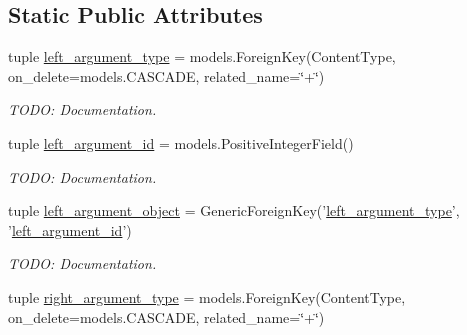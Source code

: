 \subsection*{Static Public Attributes}
\begin{DoxyCompactItemize}
\item 
\hypertarget{classscheduler_1_1models_1_1_user_preference_or_constraint_a0455877d277a31c0561935c7074b664b}{tuple \hyperlink{classscheduler_1_1models_1_1_user_preference_or_constraint_a0455877d277a31c0561935c7074b664b}{left\-\_\-argument\-\_\-type} = models.\-Foreign\-Key(Content\-Type, on\-\_\-delete=models.\-C\-A\-S\-C\-A\-D\-E, related\-\_\-name=\char`\"{}+\char`\"{})}\label{classscheduler_1_1models_1_1_user_preference_or_constraint_a0455877d277a31c0561935c7074b664b}

\begin{DoxyCompactList}\small\item\em T\-O\-D\-O\-: Documentation. \end{DoxyCompactList}\item 
\hypertarget{classscheduler_1_1models_1_1_user_preference_or_constraint_aa1b1f271f6f1f18d5e99996db4840337}{tuple \hyperlink{classscheduler_1_1models_1_1_user_preference_or_constraint_aa1b1f271f6f1f18d5e99996db4840337}{left\-\_\-argument\-\_\-id} = models.\-Positive\-Integer\-Field()}\label{classscheduler_1_1models_1_1_user_preference_or_constraint_aa1b1f271f6f1f18d5e99996db4840337}

\begin{DoxyCompactList}\small\item\em T\-O\-D\-O\-: Documentation. \end{DoxyCompactList}\item 
\hypertarget{classscheduler_1_1models_1_1_user_preference_or_constraint_a1880c90f057ecd54a9a484faa30e3df5}{tuple \hyperlink{classscheduler_1_1models_1_1_user_preference_or_constraint_a1880c90f057ecd54a9a484faa30e3df5}{left\-\_\-argument\-\_\-object} = Generic\-Foreign\-Key('\hyperlink{classscheduler_1_1models_1_1_user_preference_or_constraint_a0455877d277a31c0561935c7074b664b}{left\-\_\-argument\-\_\-type}', '\hyperlink{classscheduler_1_1models_1_1_user_preference_or_constraint_aa1b1f271f6f1f18d5e99996db4840337}{left\-\_\-argument\-\_\-id}')}\label{classscheduler_1_1models_1_1_user_preference_or_constraint_a1880c90f057ecd54a9a484faa30e3df5}

\begin{DoxyCompactList}\small\item\em T\-O\-D\-O\-: Documentation. \end{DoxyCompactList}\item 
\hypertarget{classscheduler_1_1models_1_1_user_preference_or_constraint_a30dcc18f79528b7860691bced63d3426}{tuple \hyperlink{classscheduler_1_1models_1_1_user_preference_or_constraint_a30dcc18f79528b7860691bced63d3426}{right\-\_\-argument\-\_\-type} = models.\-Foreign\-Key(Content\-Type, on\-\_\-delete=models.\-C\-A\-S\-C\-A\-D\-E, related\-\_\-name=\char`\"{}+\char`\"{})}\label{classscheduler_1_1models_1_1_user_preference_or_constraint_a30dcc18f79528b7860691bced63d3426}


\end{DoxyCompactItemize}

